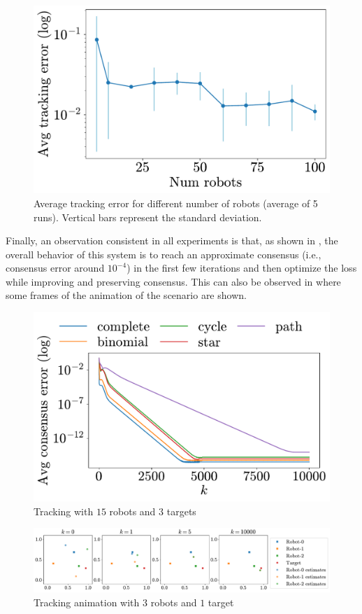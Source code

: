 \documentclass[a4paper,11pt,oneside]{book}
\begin{document}
\begin{figure}[h!]
      \centering
      \includegraphics[width=0.46\linewidth]{./figs/tracking/average/avg_tracking.pdf}
      \caption{Average tracking error for different number of robots (average of 5 runs). Vertical bars represent the standard deviation.}
      \label{fig:tracking_avg_error_runs}
\end{figure}


Finally, an observation consistent in all experiments is that, as shown in , the overall behavior of this system is to reach an approximate consensus (i.e., consensus error around $10^{-4}$) in the first few iterations and then optimize the loss while improving and preserving consensus. This can also be observed in  where some frames of the animation of the scenario are shown.

\begin{figure}[h!]
      \centering
      \includegraphics[width=0.44\linewidth]{./figs/tracking/15_3_2/consensus.pdf} 
      \caption{Tracking with $15$ robots and $3$ targets}
      \label{fig:tracking_consensus}
\end{figure}

\begin{figure}[h!]
      \centering
      \includegraphics[width=0.9\linewidth]{./figs/tracking/anim.pdf} 
      \caption{Tracking animation with $3$ robots and $1$ target}
      \label{fig:tracking_animation}
\end{figure}
\end{document}
